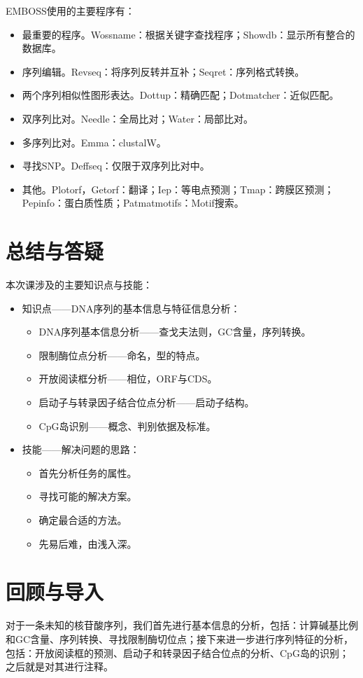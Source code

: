 \documentclass[11pt,a4paper,twoside]{book}
\begin{document}
EMBOSS使用的主要程序有：
\begin{itemize}
  \item 最重要的程序。Wossname：根据关键字查找程序；Showdb：显示所有整合的数据库。
  \item 序列编辑。Revseq：将序列反转并互补；Seqret：序列格式转换。
  \item 两个序列相似性图形表达。Dottup：精确匹配；Dotmatcher：近似匹配。
  \item 双序列比对。Needle：全局比对；Water：局部比对。
  \item 多序列比对。Emma：clustalW。
  \item 寻找SNP。Deffseq：仅限于双序列比对中。
  \item 其他。Plotorf，Getorf：翻译；Iep：等电点预测；Tmap：跨膜区预测；Pepinfo：蛋白质性质；Patmatmotifs：Motif搜索。
\end{itemize}

\section{总结与答疑}
本次课涉及的主要知识点与技能：
\begin{itemize}
  \item 知识点——DNA序列的基本信息与特征信息分析：
    \begin{itemize}
      \item DNA序列基本信息分析——查戈夫法则，GC含量，序列转换。
      \item 限制酶位点分析——命名，型的特点。
      \item 开放阅读框分析——相位，ORF与CDS。
      \item 启动子与转录因子结合位点分析——启动子结构。
      \item CpG岛识别——概念、判别依据及标准。
    \end{itemize}
  \item 技能——解决问题的思路：
    \begin{itemize}
      \item 首先分析任务的属性。
      \item 寻找可能的解决方案。
      \item 确定最合适的方法。
      \item 先易后难，由浅入深。
    \end{itemize}
\end{itemize}

\section{回顾与导入}
对于一条未知的核苷酸序列，我们首先进行基本信息的分析，包括：计算碱基比例和GC含量、序列转换、寻找限制酶切位点；接下来进一步进行序列特征的分析，包括：开放阅读框的预测、启动子和转录因子结合位点的分析、CpG岛的识别；之后就是对其进行注释。
\end{document}
